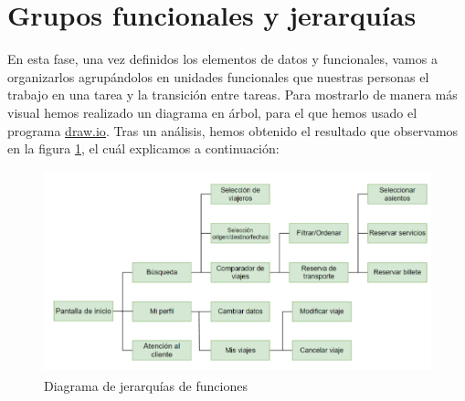 \section{Grupos funcionales y jerarquías}

En esta fase, una vez definidos los elementos de datos y funcionales, vamos a
organizarlos agrupándolos en unidades funcionales que nuestras personas el
trabajo en una tarea y la transición entre tareas. Para mostrarlo de manera más
visual hemos realizado un diagrama en árbol, para el que hemos usado el
programa \underline{\href{https://www.drawio.com/}{draw.io}}. Tras un análisis, 
hemos obtenido el resultado que observamos en la figura \ref{fig:jerarquias}, el cuál explicamos a 
continuación:
\begin{figure}[H]
      \centering
      \includegraphics[width=0.8\linewidth]{./Imagenes/jerarquia.png}
      \caption{Diagrama de jerarquías de funciones}
      \label{fig:jerarquias}
\end{figure}

